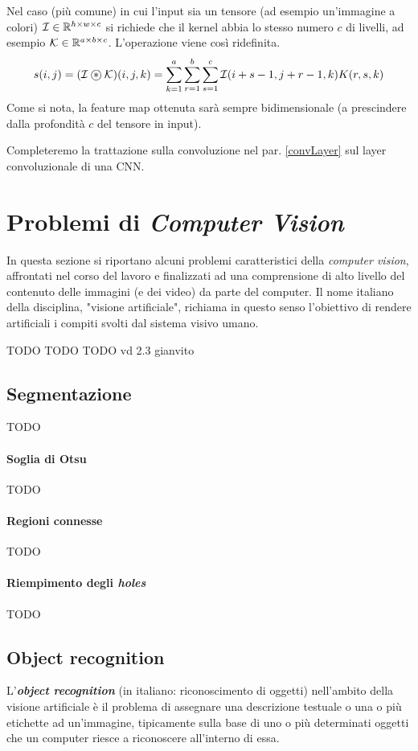 Nel caso (più comune) in cui l’input sia un tensore (ad esempio un’immagine a colori) $\mathcal{I}\in\mathbb{R}^{h\times w\times c}$ si richiede che il kernel abbia lo stesso numero $c$ di livelli, ad esempio $\mathcal{K}\in\mathbb{R}^{a\times b\times c}$. L'operazione viene così ridefinita.
\begin{equation*}
s(i,j)=(\mathcal{I}\oast\mathcal{K})(i,j,k)=\sum_{k=1}^a\sum_{r=1}^b\sum_{s=1}^c\mathcal{I}(i+s-1,j+r-1,k)K(r,s,k)
\end{equation*}
Come si nota, la feature map ottenuta sarà sempre bidimensionale (a prescindere dalla profondità $c$ del tensore in input).

Completeremo la trattazione sulla convoluzione nel par. \ref{convLayer} sul layer convoluzionale di una CNN.

\section{Problemi di \textit{Computer Vision}}
In questa sezione si riportano alcuni problemi caratteristici della \textit{computer vision}, affrontati nel corso del lavoro e finalizzati ad una comprensione di alto livello del contenuto delle immagini (e dei video) da parte del computer. Il nome italiano della disciplina, "visione artificiale", richiama in questo senso l'obiettivo di rendere artificiali i compiti svolti dal sistema visivo umano.

TODO TODO TODO vd 2.3 gianvito

\subsection{Segmentazione}
TODO
\paragraph*{Soglia di Otsu}
TODO
\paragraph*{Regioni connesse}
TODO
\paragraph*{Riempimento degli \textit{holes}}
TODO

\subsection{Object recognition}
\label{objectRecognition}
L'\textbf{\textit{object recognition}} (in italiano: riconoscimento di oggetti) nell'ambito della visione artificiale è il problema di assegnare una descrizione testuale o una o più etichette ad un'immagine, tipicamente sulla base di uno o più determinati oggetti che un computer riesce a riconoscere all'interno di essa.

